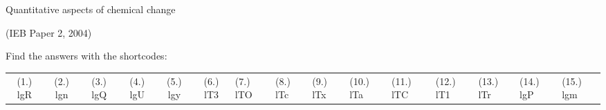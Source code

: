 \begin{eocexercises}{Quantitative aspects of chemical change}
\begin{enumerate}[noitemsep, label=\textbf{\arabic*}. ]
\begin{enumerate}[noitemsep, label=\textbf{\alph*}. ]
(IEB Paper 2, 2004)
\end{enumerate}
                \end{enumerate}
  \label{m38712**end}
  \label{0044f0dab6cfd2ca2bac282dc4009886**end}
\par {} Find the answers with the shortcodes:
 \par \begin{tabular}[h]{cccccc}
 (1.) lgR  &  (2.) lgn  &  (3.) lgQ  &  (4.) lgU  &  (5.) lgy  &  (6.) lT3  &  (7.) lTO  &  (8.) lTc  &  (9.) lTx  &  (10.) lTa  &  (11.) lTC  &  (12.) lT1  &  (13.) lTr  &  (14.) lgP  &  (15.) lgm  & \end{tabular}
\end{eocexercises}
